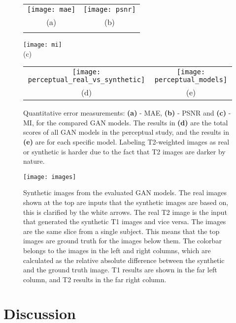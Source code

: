 \documentclass{article}
\begin{document}
\begin{figure*}[]
    \newcommand{\scaling}{0.3}
    \centering
    \begin{tabular}{c c}
         \texttt{[image: mae]} & \texttt{[image: psnr]} \\
         (a) & (b) \\ \vspace{3mm}
    \end{tabular}
        \texttt{[image: mi]} \\
        (c) \\ \vspace{7mm}
        
    \begin{tabular}{c c}     
        \texttt{[image: perceptual\_real\_vs\_synthetic]}  & \texttt{[image: perceptual\_models]} \\
         (d) & (e) \\
    \end{tabular}
    \caption{Quantitative error measurements: \textbf{(a)} - MAE, \textbf{(b)} - PSNR and \textbf{(c)} - MI, for the compared GAN models. The results in \textbf{(d)} are the total scores of all GAN models in the perceptual study, and the results in \textbf{(e)} are for each specific model. Labeling T2-weighted images as real or synthetic is harder due to the fact that T2 images are darker by nature.
    }
    \label{fig:1}
\end{figure*}

\begin{figure*}
    \centering
    \texttt{[image: images]}
    \caption{Synthetic images from the evaluated GAN models. The real images shown at the top are inputs that the synthetic images are based on, this is clarified by the white arrows. The real T2 image is the input that generated the synthetic T1 images and vice versa. The images are the same slice from a single subject. This means that the top images are ground truth for the images below them. The colorbar belongs to the images in the left and right columns, which are calculated as the relative absolute difference between the synthetic and the ground truth image. T1 results are shown in the far left column, and T2 results in the far right column.}
    \label{fig:2}
\end{figure*}

\section{Discussion}
\end{document}
